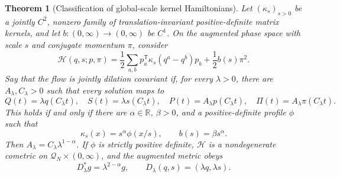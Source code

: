 \documentclass[11pt]{article}
\newtheorem{theorem}{Theorem}
\newcommand{\R}{\mathbb{R}}
\newcommand{\Q}{\mathcal{Q}}
\begin{document}
\begin{theorem}[Classification of global-scale kernel Hamiltonians]
\label{thm:augmented}
Let \((\kappa_s)_{s>0}\) be a jointly \(C^2\), nonzero family of
translation-invariant positive-definite matrix kernels, and let
\(b:(0,\infty)\to(0,\infty)\) be \(C^1\).  On the augmented phase space
with scale \(s\) and conjugate momentum \(\pi\), consider
\begin{equation}
 \mathcal H(q,s;p,\pi)
 =\frac12\sum_{a,b}p_a^{\mathsf T}
 \kappa_s(q^a-q^b)p_b+\frac12b(s)\pi^2.
 \label{eq:augH}
\end{equation}
Say that the flow is jointly dilation covariant if, for every \(\lambda>0\),
there are \(A_\lambda,C_\lambda>0\) such that every solution maps to
\[
 Q(t)=\lambda q(C_\lambda t),\quad
 S(t)=\lambda s(C_\lambda t),\quad
 P(t)=A_\lambda p(C_\lambda t),\quad
 \Pi(t)=A_\lambda\pi(C_\lambda t).
\]
This holds if and only if there are \(\alpha\in\R\), \(\beta>0\), and a
positive-definite profile \(\phi\) such that
\begin{equation}
 \boxed{\quad
 \kappa_s(x)=s^\alpha\phi(x/s),
 \qquad b(s)=\beta s^\alpha.
 \quad}
 \label{eq:powerprofile}
\end{equation}
Then \(A_\lambda=C_\lambda\lambda^{1-\alpha}\).  If \(\phi\) is strictly
positive definite, \(\mathcal H\) is a nondegenerate cometric on
\(\Q_N\times(0,\infty)\), and the augmented metric obeys
\[
 D_\lambda^*g=\lambda^{2-\alpha}g,
 \qquad D_\lambda(q,s)=(\lambda q,\lambda s).
\]
\end{theorem}
\end{document}
